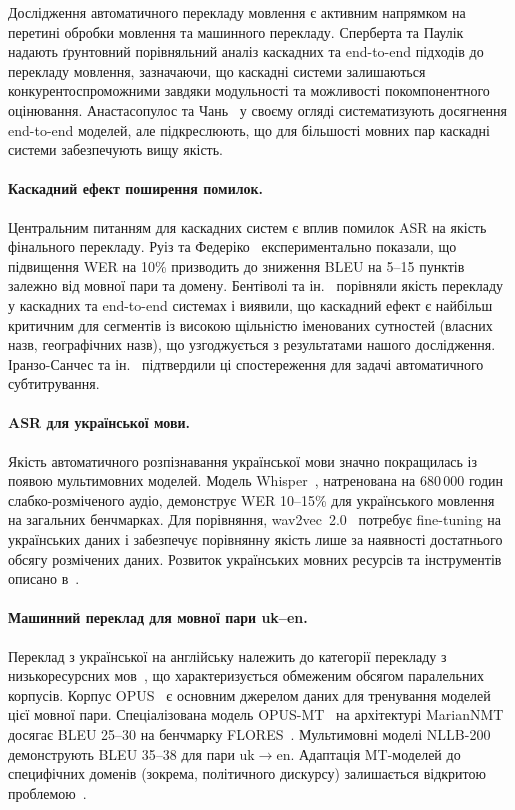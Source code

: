 Дослідження автоматичного перекладу мовлення є активним напрямком
на перетині обробки мовлення та машинного перекладу. Сперберта та
Паулік~\cite{cascade_st} надають ґрунтовний порівняльний аналіз
каскадних та end-to-end підходів до перекладу мовлення, зазначаючи, що
каскадні системи залишаються конкурентоспроможними завдяки модульності
та можливості покомпонентного оцінювання. Анастасопулос та
Чань~\cite{st_survey} у своєму огляді систематизують досягнення
end-to-end моделей, але підкреслюють, що для більшості мовних пар
каскадні системи забезпечують вищу якість.

\paragraph{Каскадний ефект поширення помилок.}
Центральним питанням для каскадних систем є вплив помилок ASR на якість
фінального перекладу. Руіз та Федеріко~\cite{error_propagation}
експериментально показали, що підвищення WER на 10\% призводить до
зниження BLEU на 5--15 пунктів залежно від мовної пари та домену.
Бентіволі та ін.~\cite{bentivogli_cascade} порівняли якість перекладу
у каскадних та end-to-end системах і виявили, що каскадний ефект є
найбільш критичним для сегментів із високою щільністю іменованих
сутностей (власних назв, географічних назв), що узгоджується з
результатами нашого дослідження. Іранзо-Санчес та
ін.~\cite{iranzo_cascade} підтвердили ці спостереження для задачі
автоматичного субтитрування.

\paragraph{ASR для української мови.}
Якість автоматичного розпізнавання української мови значно покращилась
із появою мультимовних моделей. Модель Whisper~\cite{whisper},
натренована на 680\,000 годин слабко-розміченого аудіо, демонструє
WER 10--15\% для українського мовлення на загальних бенчмарках. Для
порівняння, wav2vec~2.0~\cite{wav2vec} потребує fine-tuning на
українських даних і забезпечує порівнянну якість лише за наявності
достатнього обсягу розмічених даних. Розвиток українських мовних
ресурсів та інструментів описано в~\cite{uk_nlp}.

\paragraph{Машинний переклад для мовної пари uk--en.}
Переклад з української на англійську належить до категорії перекладу
з низькоресурсних мов~\cite{low_resource_mt}, що характеризується
обмеженим обсягом паралельних корпусів. Корпус OPUS~\cite{opus_corpus}
є основним джерелом даних для тренування моделей цієї мовної пари.
Спеціалізована модель OPUS-MT~\cite{opus_mt} на архітектурі
MarianNMT~\cite{marian_nmt} досягає BLEU 25--30 на бенчмарку
FLORES~\cite{flores}. Мультимовні моделі NLLB-200~\cite{nllb}
демонструють BLEU 35--38 для пари uk$\to$en. Адаптація MT-моделей
до специфічних доменів (зокрема, політичного дискурсу) залишається
відкритою проблемою~\cite{domain_adaptation}.

